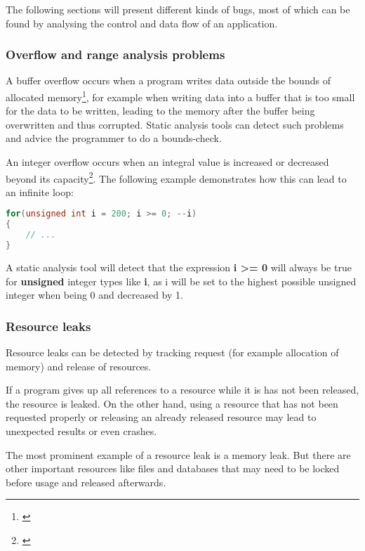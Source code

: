 The following sections will present different kinds of bugs, most of which can be found by analysing the control and data flow of an application.

\subsubsection{Overflow and range analysis problems}

A buffer overflow occurs when a program writes data outside the bounds of allocated memory\footnote{\citep[175]{SecureProgramming}}, for example when writing data into a buffer that is too small for the data to be written, leading to the memory after the buffer being overwritten and thus corrupted. Static analysis tools can detect such problems and advice the programmer to do a bounds-check.

An integer overflow occurs when an integral value is increased or decreased beyond its capacity\footnote{\citep[235]{SecureProgramming}}. The following example demonstrates how this can lead to an infinite loop:

\SingleSpacing
\begin{lstlisting}[language=C++, caption=Integer ''underflow'' in C++]
for(unsigned int i = 200; i >= 0; --i)
{
	// ...
}
\end{lstlisting}
\OnehalfSpacing

A static analysis tool will detect that the expression \textbf{i \textgreater= 0} will always be true for \textbf{unsigned} integer types like \textbf{i}, as i will be set to the highest possible unsigned integer when being 0 and decreased by 1.

\subsubsection{Resource leaks}

Resource leaks can be detected by tracking request (for example allocation of memory) and release of resources.

If a program gives up all references to a resource while it is has not been released, the resource is leaked. On the other hand, using a resource that has not been requested properly or releasing an already released resource may lead to unexpected results or even crashes.

The most prominent example of a resource leak is a memory leak. But there are other important resources like files and databases that may need to be locked before usage and released afterwards.

